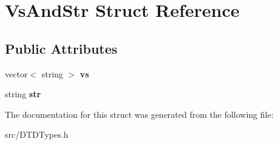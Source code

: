 \hypertarget{struct_vs_and_str}{\section{\-Vs\-And\-Str \-Struct \-Reference}
\label{struct_vs_and_str}
}
\subsection*{\-Public \-Attributes}
\begin{DoxyCompactItemize}
\item 
\hypertarget{struct_vs_and_str_a9f6a881f61814f7d84d2c33ed6f145ad}{vector$<$ string $>$ {\bfseries vs}}\label{struct_vs_and_str_a9f6a881f61814f7d84d2c33ed6f145ad}

\item 
\hypertarget{struct_vs_and_str_a00c9095327ed7e352e0d84d5a82cad72}{string {\bfseries str}}\label{struct_vs_and_str_a00c9095327ed7e352e0d84d5a82cad72}

\end{DoxyCompactItemize}


\-The documentation for this struct was generated from the following file\-:\begin{DoxyCompactItemize}
\item 
src/\-D\-T\-D\-Types.\-h\end{DoxyCompactItemize}
